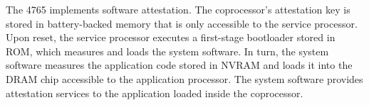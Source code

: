 The 4765 implements software attestation. The coprocessor's attestation key is
stored in battery-backed memory that is only accessible to the service
processor. Upon reset, the service processor executes a first-stage bootloader
stored in ROM, which measures and loads the system software. In turn, the
system software measures the application code stored in NVRAM and loads it into
the DRAM chip accessible to the application processor. The system software
provides attestation services to the application loaded inside the coprocessor.
